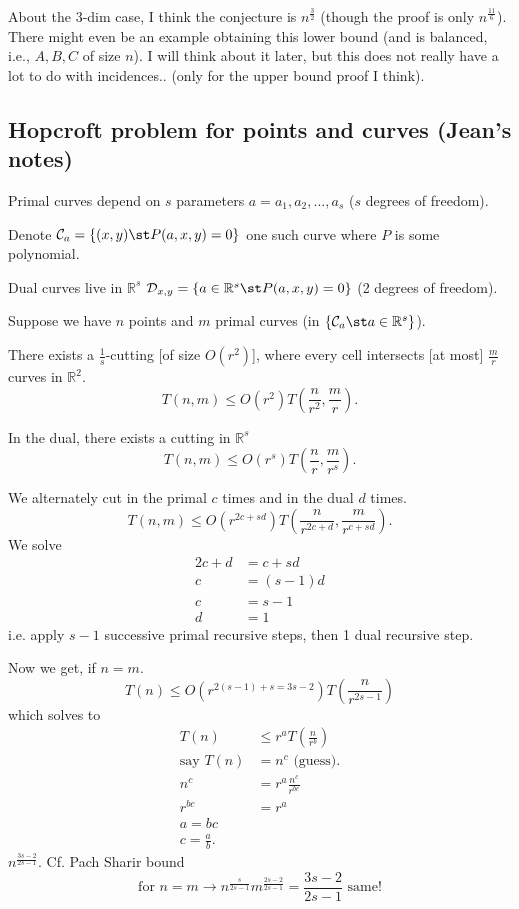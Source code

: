 About the 3-dim case, I think the conjecture is $n^{\frac{3}{2}}$ (though the proof
is only $n^{\frac{11}{6}}$).
There might even be an example obtaining this lower bound (and is balanced,
i.e., $A,B,C$ of size $n$). I will think about it later, but this does not
really have a lot to do with incidences.. (only for the upper bound proof I
think).

\subsection{Hopcroft problem for points and curves (Jean's notes)}

Primal curves depend on $s$ parameters $a=a_1,a_2,\ldots,a_s$ ($s$ degrees of
freedom).

Denote $\mathcal{C}_a = \{(x,y)\st P(a,x,y) = 0\}$ one such curve where \(P\)
is some polynomial.

Dual curves live in $\mathbb{R}^s$
$
\mathcal{D}_{x,y} = \{a \in \mathbb{R}^s \st P(a,x,y)=0\}
$
(2 degrees of freedom).

Suppose we have $n$ points and $m$ primal curves (in $\{\mathcal{C}_a \st a \in
\mathbb{R}^s\}$).

There exists a \(\frac{1}{s}\)-cutting [of size $O(r^2)$], where every
cell intersects [at most] $\frac{m}{r}$ curves in $\mathbb{R}^2$.
$$
T(n,m) \le O(r^2) T(\frac{n}{r^2},\frac{m}{r}).
$$

In the dual, there exists a cutting in \(\mathbb{R}^s\)
$$
T(n,m) \le O(r^s) T(\frac{n}{r},\frac{m}{r^s}).
$$

We alternately cut in the primal $c$ times and in the dual $d$ times.
$$
T(n,m) \le O(r^{2c+sd}) T(\frac{n}{r^{2c+d}},\frac{m}{r^{c+sd}}).
$$
We solve
\begin{align*}
	2c+d &= c+sd\\
	c &= (s-1) d\\
	c &= s - 1\\
	d &= 1
\end{align*}
i.e. apply $s-1$ successive primal recursive steps, then 1 dual recursive step.

Now we get, if \(n=m\).
$$
T(n) \le O(r^{2(s-1)+s = 3s - 2}) T(\frac{n}{r^{2s-1}})
$$
which solves to
\begin{align*}
	T(n) &\le r^a T(\frac{n}{r^b})\\
	\text{say } T(n) &= n^c \text{ (guess).}\\
	n^c &= r^a \frac{n^c}{r^{bc}}\\
	r^{bc} &= r^a\\
	a = bc\\
	c = \frac{a}{b}.
\end{align*}
$n^{\frac{3s-2}{2s-1}}$. Cf. Pach Sharir bound~\cite{}
$$
\text{for } n = m \to n^\frac{s}{2s-1} m^\frac{2s-2}{2s-1} =
\frac{3s-2}{2s-1} \text{ same!}
$$


